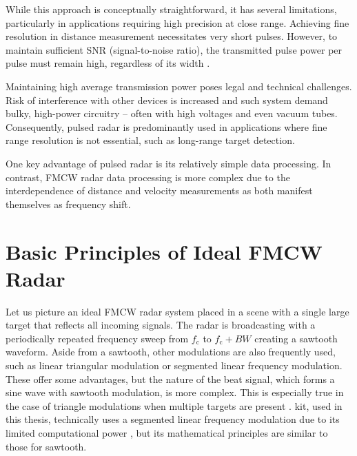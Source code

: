 While this approach is conceptually straightforward, it has several limitations, particularly in applications requiring high precision at close range.
Achieving fine resolution in distance measurement necessitates very short pulses.
However, to maintain sufficient SNR (signal-to-noise ratio), the transmitted pulse power per pulse must remain high, regardless of its width \cite{jankiraman2018}.

Maintaining high average transmission power poses legal and technical challenges.
Risk of interference with other devices is increased and such system demand bulky, high-power circuitry -- often with high voltages and even vacuum tubes.
Consequently, pulsed radar is predominantly used in applications where fine range resolution is not essential, such as long-range target detection.

One key advantage of pulsed radar is its relatively simple data processing.
In contrast, FMCW radar data processing is more complex due to the interdependence of distance and velocity measurements as both manifest themselves as frequency shift.

\section{Basic Principles of Ideal FMCW Radar}

Let us picture an ideal FMCW radar system placed in a scene with a single large target that reflects all incoming signals.
The radar is broadcasting with a periodically repeated frequency sweep from $f_\mathrm{c}$ to $f_\mathrm{c}+BW$ creating a sawtooth waveform.
Aside from a sawtooth, other modulations are also frequently used, such as linear triangular modulation or segmented linear frequency modulation.
These offer some advantages, but the nature of the beat signal, which forms a sine wave with sawtooth modulation, is more complex.
This is especially true in the case of triangle modulations when multiple targets are present \cite{jankiraman2018}.
\sirad kit, used in this thesis, technically uses a segmented linear frequency modulation due to its limited computational power \cite{siradPRO}, but its mathematical principles are similar to those for sawtooth.

